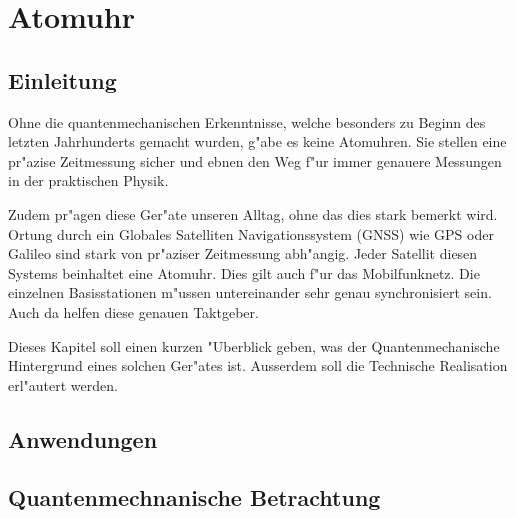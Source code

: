 \chapter{Atomuhr\label{chapter:atomuhr}}
\begin{refsection}

\section{Einleitung}
%

Ohne die quantenmechanischen Erkenntnisse, welche besonders zu Beginn des letzten Jahrhunderts gemacht wurden, g"abe es keine Atomuhren. 
Sie stellen eine pr"azise Zeitmessung sicher und ebnen den Weg f"ur immer genauere Messungen in der praktischen Physik. 

Zudem pr"agen diese Ger"ate unseren Alltag, ohne das dies stark bemerkt wird. 
Ortung durch ein Globales Satelliten Navigationssystem (GNSS) wie GPS oder Galileo sind stark von pr"aziser Zeitmessung abh"angig. 
Jeder Satellit diesen Systems beinhaltet eine Atomuhr.
Dies gilt auch f"ur das Mobilfunknetz. Die einzelnen Basisstationen m"ussen untereinander sehr genau synchronisiert sein. Auch da helfen diese genauen Taktgeber.

Dieses Kapitel soll einen kurzen "Uberblick geben, was der Quantenmechanische Hintergrund eines solchen Ger"ates ist. Ausserdem soll die Technische Realisation erl"autert werden.
\section{Anwendungen}

\section{Quantenmechnanische Betrachtung}


\end{refsection}
